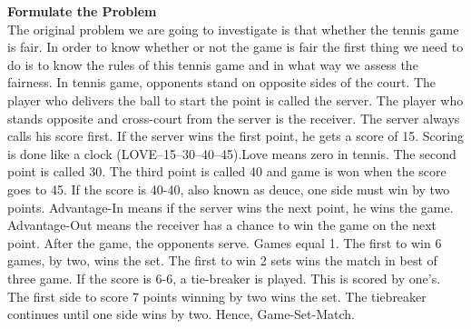 \documentclass[12pt]{article}
\begin{document}
\noindent\textbf{Formulate the Problem}\\
The original problem we are going to investigate is that whether the tennis game is fair. In order to know whether or not the game is fair the first thing we need to do is to know the rules of this tennis game and in what way we assess the fairness. In tennis game, opponents stand on opposite sides of the court. The player who delivers the ball to start the point is called the server. The player who stands opposite and cross-court from the server is the receiver.  The server always calls his score first. If the server wins the first point, he gets a score of 15. Scoring is done like a clock (LOVE--15--30--40--45).Love means zero in tennis. The second point is called 30. The third point is called 40 and game is won when the score goes to 45. If the score is 40-40, also known as deuce, one side must win by two points. Advantage-In means if the server wins the next point, he wins the game. Advantage-Out means the receiver has a chance to win the game on the next point. After the game, the opponents serve. Games equal 1. The first to win 6 games, by two, wins the set. The first to win 2 sets wins the match in best of three game. If the score is 6-6, a tie-breaker is played. This is scored by one's. The first side to score 7 points winning by two wins the set. The tiebreaker continues until one side wins by two. Hence, Game-Set-Match.
\end{document}
